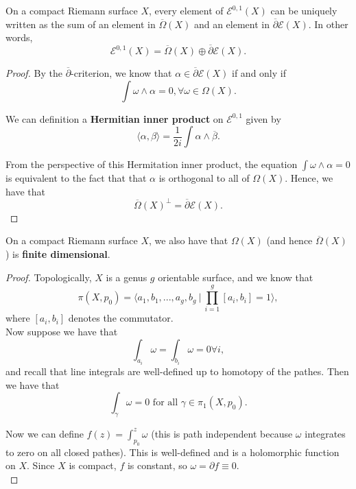 \documentclass{article}
\begin{document}
{\begin{proposition}
On a compact Riemann surface $X$, every element of $\mathcal{E}^{0,1}(X)$ can be uniquely written as the sum of an element in $\overline{\Omega}(X)$ and an element in $\overline{\partial} \mathcal{E}(X)$. In other words,
    $$\mathcal{E}^{0,1}(X) = \overline{\Omega}(X) \oplus \overline{\partial} \mathcal{E}(X).$$
\end{proposition}

\begin{proof}
By the $\overline{\partial}$-criterion, we know that $\alpha \in \overline{\partial} \mathcal{E}(X)$ if and only if
\[\int \omega \wedge \alpha = 0, \forall \omega \in \Omega(X).\]
\begin{definition}
    We can definition a \textbf{Hermitian inner product} on $\mathcal{E}^{0, 1}$ given by
    \[\langle \alpha, \beta \rangle = \frac{1}{2i} \int \alpha \wedge \overline{\beta}.\]
\end{definition}
From the perspective of this Hermitation inner product, the equation $\int \omega \wedge \alpha = 0$ is equivalent to the fact that that $\alpha$ is orthogonal to all of $\Omega(X)$. Hence, we have that
\[\overline{\Omega}(X)^\bot = \overline{\partial} \mathcal{E}(X).\]
\end{proof}

\begin{theorem}
    On a compact Riemann surface $X$, we also have that $\Omega(X)$ (and hence $\overline{\Omega}(X)$) is \textbf{finite dimensional}.
\end{theorem}

\begin{proof}
    Topologically, $X$ is a genus $g$ orientable surface, and we know that
    \[\pi(X, p_0) = \langle a_1, b_1, ..., a_g, b_g\ |\ \prod_{i = 1}^g [a_i, b_i] = 1\rangle,\]
    where $[a_i, b_i]$ denotes the commutator.\\

    Now suppose we have that
    \[\int_{a_i} \omega = \int_{b_i} \omega = 0 \forall i,\]
    and recall that line integrals are well-defined up to homotopy of the pathes. Then we have that
    \[\int_{\gamma} \omega = 0 \text{ for all } \gamma \in \pi_1(X, p_0).\]
    
    Now we can define $f(z) = \int_{p_0}^z \omega$ (this is path independent because $\omega$ integrates to zero on all closed pathes). This is well-defined and is a holomorphic function on $X$. Since $X$ is compact, $f$ is constant, so $\omega = \partial f \equiv 0$.\\


\end{proof}}
\end{document}
